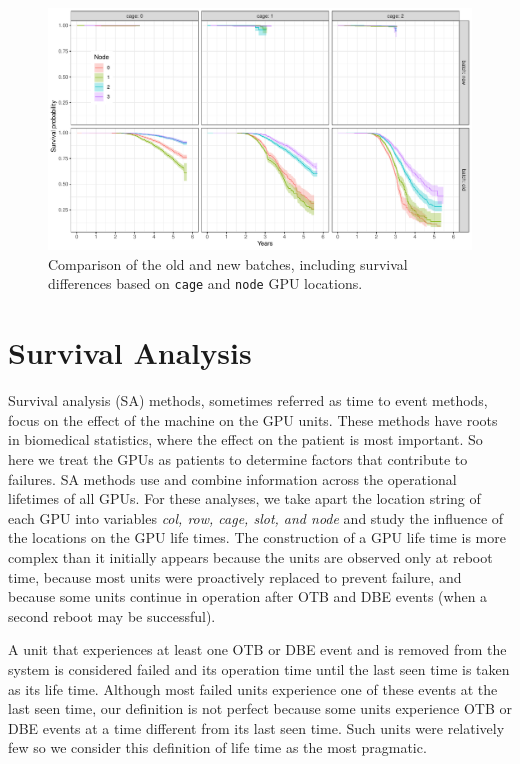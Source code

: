 \begin{figure}
  \centering
  \includegraphics[width=7in]{figs/km_cage-node_a001.pdf}
  \caption{Comparison of the old and new batches, including survival
    differences based on {\tt cage} and {\tt node} GPU locations.}
  \label{fig:km-all-cage-node}
\end{figure}
\section{Survival Analysis}
\label{section:survival}
\renewcommand{\pkg}[1]{\textsf{#1}} Survival analysis (SA) methods,
sometimes referred as time to event methods, focus on the effect of
the machine on the GPU units. These methods have roots in biomedical
statistics, where the effect on the patient is most important. So here
we treat the GPUs as patients to determine factors that contribute to
failures. SA methods use and combine information across the
operational lifetimes of all GPUs. For these analyses,
we take apart the location string of each GPU into variables {\em col,
  row, cage, slot, and node} and study the influence of the locations
on the GPU life times. The construction of a GPU life time is more
complex than it initially appears because the units are observed only
at reboot time, because most units were proactively replaced to
prevent failure, and because some units continue in operation after
OTB and DBE events (when a second reboot may be successful).

A unit that experiences at least one OTB or DBE event and is removed
from the system is considered failed and its operation time until the
last seen time is taken as its life time. Although most failed units
experience one of these events at the last seen time, our definition
is not perfect because some units experience OTB or DBE events at a
time different from its last seen time. Such units were relatively few
so we consider this definition of life time as the most pragmatic.


